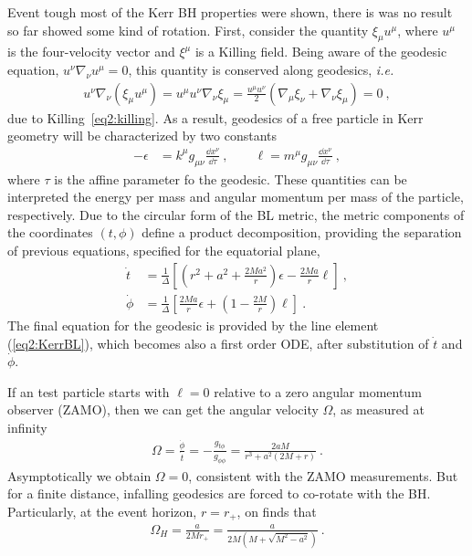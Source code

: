 Event tough most of the Kerr BH properties were shown, there is was no result so far showed some kind of rotation.
First, consider the quantity $\xi_\mu u^\mu$, where $u^\mu$ is the four-velocity vector and $\xi^\mu$ is a Killing field.
Being aware of the geodesic equation, $u^\nu \nabla_\nu u^\mu = 0$, this quantity is conserved along geodesics, \emph{i.e.}
\begin{align}
    u^\nu \nabla_\nu ( \xi_\mu u^\mu ) = u^\mu u^\nu \nabla_\nu \xi_\mu = \frac{u^\mu u^\nu }{2} ( \nabla_\mu \xi_\nu + \nabla_\nu \xi_\mu ) = 0 ~,
    \label{eq2:geodesicKilling}
\end{align}
due to Killing~\eqref{eq2:killing}. As a result, geodesics of a free particle in Kerr geometry will be characterized by two constants
\begin{align}
    -\epsilon &= k^\mu g_{\mu\nu} \frac{\dd x^\nu}{\dd \tau} ~, \qquad \ell = m^\mu g_{\mu\nu} \frac{\dd x^\nu}{\dd \tau} ~,
    \label{eq2:geodesicConsts}
\end{align}
where $\tau$ is the affine parameter fo the geodesic. These quantities can be interpreted the energy per mass and angular momentum per mass of the particle, respectively. Due to the circular form of the BL metric, the metric components of the coordinates $(t,\phi)$ define a product decomposition, providing the separation of previous equations, specified for the equatorial plane,
\begin{align}
    \dot{t} &= \frac{1}{\Delta} \left[ (r^2+a^2 +\frac{2 M a^2}{r})\epsilon - \frac{2 M a}{r} \ell \right] ~, \\
    \dot{\phi} &= \frac{1}{\Delta} \left[ \frac{2 M a}{r} \epsilon +\left( 1- \frac{2 M}{r} \right) \ell \right]  ~.
    \label{eq2:geodesicPhiT}
\end{align}
The final equation for the geodesic is provided by the line element (\ref{eq2:KerrBL}), which becomes also a first order ODE, after substitution of $\dot{t}$ and $\dot{\phi}$.

If an test particle starts with $\ell=0$ relative to a zero angular momentum observer (ZAMO), then we can get the angular velocity $\Omega$, as measured at infinity
 \begin{align}
    \Omega = \frac{\dot{\phi}}{\dot{t}} = - \frac{g_{t\phi}}{g_{\phi\phi}} = \frac{2 a M}{r^3 + a^2 (2 M+r)} ~.
    \label{eq2:geodesicKilling}
\end{align}
Asymptotically we obtain $\Omega=0$, consistent with the ZAMO measurements. But for a finite distance, infalling geodesics are forced to co-rotate with the BH. Particularly, at the event horizon, $r=r_+$, on finds that
 \begin{align}
    \Omega_H = \frac{a}{2 M r_+} = \frac{a}{2 M (M+\sqrt{M^2-a^2})} ~.
    \label{eq2:geodesicKilling}
\end{align}


